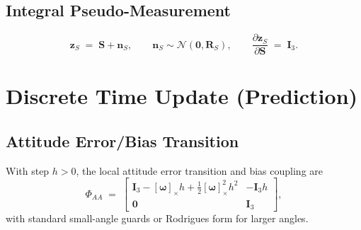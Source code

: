 \documentclass[11pt]{article}
\newcommand{\vect}[1]{\bm{#1}}
\newcommand{\mat}[1]{\bm{#1}}
\newcommand{\I}{\mat{I}}
\newcommand{\skx}[1]{\left[ #1 \right]_\times}
\begin{document}
\subsection{Integral Pseudo-Measurement}
\begin{equation}
  \vect{z}_S \;=\; \vect{S} + \vect{n}_S, \qquad
  \vect{n}_S \sim \mathcal{N}(\vect{0},\mat{R}_S), \qquad
  \frac{\partial \vect{z}_S}{\partial \vect{S}} \;=\; \I_3.
  \label{eq:S-pseudo}
\end{equation}

\section{Discrete Time Update (Prediction)}
\label{sec:discrete-pred}

\subsection{Attitude Error/Bias Transition}
With step \(h>0\), the local attitude error transition and bias coupling are
\begin{equation}
  \Phi_{AA} \;=\;
  \begin{bmatrix}
    \I_3 - \skx{\vect{\omega}} h + \tfrac12 \skx{\vect{\omega}}^2 h^2 & -\I_3 h \\
    \mat{0} & \I_3
  \end{bmatrix},
  \label{eq:PhiAA}
\end{equation}
with standard small-angle guards or Rodrigues form for larger angles.
\end{document}
